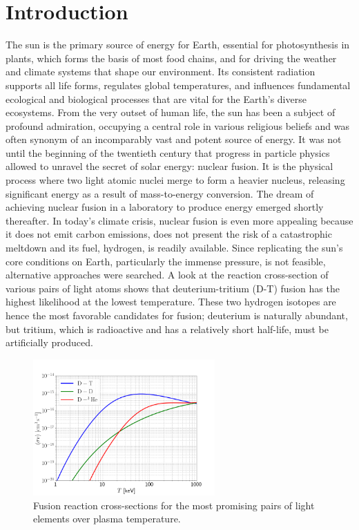 \chapter{Introduction}
\label{chap:Intro}
The sun is the primary source of energy for Earth, essential for photosynthesis in plants, which forms the basis of most food chains, and for driving the weather and climate systems that shape our environment. Its consistent radiation supports all life forms, regulates global temperatures, and influences fundamental ecological and biological processes that are vital for the Earth's diverse ecosystems. From the very outset of human life, the sun has been a subject of profound admiration, occupying a central role in various religious beliefs and was often synonym of an incomparably vast and potent source of energy. It was not until the beginning of the twentieth century that progress in particle physics allowed to unravel the secret of solar energy: nuclear fusion. It is the physical process where two light atomic nuclei merge to form a heavier nucleus, releasing significant energy as a result of mass-to-energy conversion. \newline 
The dream of achieving nuclear fusion in a laboratory to produce energy emerged shortly thereafter. In today's climate crisis, nuclear fusion is even more appealing because it does not emit carbon emissions, does not present the risk of a catastrophic meltdown and its fuel, hydrogen, is readily available. Since replicating the sun's core conditions on Earth, particularly the immense pressure, is not feasible, alternative approaches were searched. A look at the reaction cross-section of various pairs of light atoms shows that deuterium-tritium (D-T) fusion has the highest likelihood at the lowest temperature. These two hydrogen isotopes are hence the most favorable candidates for fusion; deuterium is naturally abundant, but tritium, which is radioactive and has a relatively short half-life, must be artificially produced. \newline

\begin{figure}[H]
	\centering
	\includegraphics[width=0.62\textwidth]{schemes/fusion-reactivities.png}
	\caption{Fusion reaction cross-sections for the most promising pairs of light elements over plasma temperature.}
	\label{fig:Intro_fusionCrossSections}
\end{figure}

